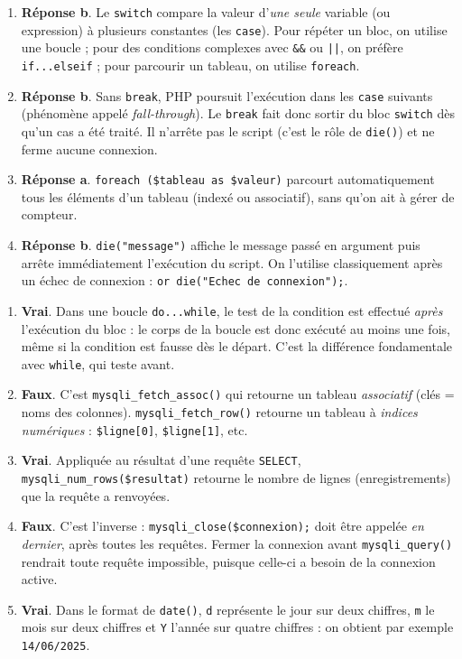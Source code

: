 \documentclass[11pt]{article}
\newcommand{\cle}[1]{{\popxbold\color{popdark}#1}}
\begin{document}
\begin{corrige}
\begin{enumerate}
\item \textbf{Réponse b}. Le \texttt{switch} compare la valeur d'\emph{une seule} variable (ou expression) à plusieurs \cle{constantes} (les \texttt{case}). Pour répéter un bloc, on utilise une boucle ; pour des conditions complexes avec \texttt{\&\&} ou \texttt{||}, on préfère \texttt{if...elseif} ; pour parcourir un tableau, on utilise \texttt{foreach}.
\item \textbf{Réponse b}. Sans \texttt{break}, PHP poursuit l'exécution dans les \texttt{case} suivants (phénomène appelé \emph{fall-through}). Le \texttt{break} fait donc sortir du bloc \texttt{switch} dès qu'un cas a été traité. Il n'arrête pas le script (c'est le rôle de \texttt{die()}) et ne ferme aucune connexion.
\item \textbf{Réponse a}. \texttt{foreach (\$tableau as \$valeur)} parcourt automatiquement tous les éléments d'un \cle{tableau} (indexé ou associatif), sans qu'on ait à gérer de compteur.
\item \textbf{Réponse b}. \texttt{die("message")} affiche le message passé en argument puis \cle{arrête immédiatement} l'exécution du script. On l'utilise classiquement après un échec de connexion : \texttt{or die("Echec de connexion");}.
\end{enumerate}
\end{corrige}

\begin{corrige}
\begin{enumerate}
\item \textbf{Vrai}. Dans une boucle \texttt{do...while}, le test de la condition est effectué \emph{après} l'exécution du bloc : le corps de la boucle est donc exécuté \cle{au moins une fois}, même si la condition est fausse dès le départ. C'est la différence fondamentale avec \texttt{while}, qui teste avant.
\item \textbf{Faux}. C'est \texttt{mysqli\_fetch\_assoc()} qui retourne un tableau \emph{associatif} (clés = noms des colonnes). \texttt{mysqli\_fetch\_row()} retourne un tableau à \emph{indices numériques} : \texttt{\$ligne[0]}, \texttt{\$ligne[1]}, etc.
\item \textbf{Vrai}. Appliquée au résultat d'une requête \texttt{SELECT}, \texttt{mysqli\_num\_rows(\$resultat)} retourne le nombre de lignes (enregistrements) que la requête a renvoyées.
\item \textbf{Faux}. C'est l'inverse : \texttt{mysqli\_close(\$connexion);} doit être appelée \emph{en dernier}, après toutes les requêtes. Fermer la connexion avant \texttt{mysqli\_query()} rendrait toute requête impossible, puisque celle-ci a besoin de la connexion active.
\item \textbf{Vrai}. Dans le format de \texttt{date()}, \texttt{d} représente le jour sur deux chiffres, \texttt{m} le mois sur deux chiffres et \texttt{Y} l'année sur quatre chiffres : on obtient par exemple \texttt{14/06/2025}.
\end{enumerate}
\end{corrige}
\end{document}
